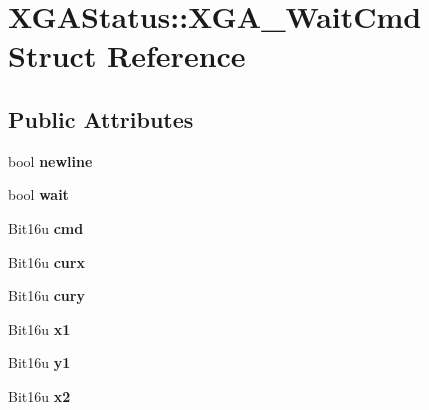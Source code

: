 \hypertarget{structXGAStatus_1_1XGA__WaitCmd}{\section{X\-G\-A\-Status\-:\-:X\-G\-A\-\_\-\-Wait\-Cmd Struct Reference}
\label{structXGAStatus_1_1XGA__WaitCmd}
}
\subsection*{Public Attributes}
\begin{DoxyCompactItemize}
\item 
\hypertarget{structXGAStatus_1_1XGA__WaitCmd_a63d6f451dd4d88b4cb6d128f5e0acc2f}{bool {\bfseries newline}}\label{structXGAStatus_1_1XGA__WaitCmd_a63d6f451dd4d88b4cb6d128f5e0acc2f}

\item 
\hypertarget{structXGAStatus_1_1XGA__WaitCmd_aebb5a2107d507ce29407639622f0eff2}{bool {\bfseries wait}}\label{structXGAStatus_1_1XGA__WaitCmd_aebb5a2107d507ce29407639622f0eff2}

\item 
\hypertarget{structXGAStatus_1_1XGA__WaitCmd_af75876d380fdc091f3931c90e5425b33}{Bit16u {\bfseries cmd}}\label{structXGAStatus_1_1XGA__WaitCmd_af75876d380fdc091f3931c90e5425b33}

\item 
\hypertarget{structXGAStatus_1_1XGA__WaitCmd_aaf89271d9687c8c9e595069205a8c5de}{Bit16u {\bfseries curx}}\label{structXGAStatus_1_1XGA__WaitCmd_aaf89271d9687c8c9e595069205a8c5de}

\item 
\hypertarget{structXGAStatus_1_1XGA__WaitCmd_afbf370accfc2d55e4cd9a5945eb48748}{Bit16u {\bfseries cury}}\label{structXGAStatus_1_1XGA__WaitCmd_afbf370accfc2d55e4cd9a5945eb48748}

\item 
\hypertarget{structXGAStatus_1_1XGA__WaitCmd_ae4b5ad4b1fc4b641709ddeb114034bc0}{Bit16u {\bfseries x1}}\label{structXGAStatus_1_1XGA__WaitCmd_ae4b5ad4b1fc4b641709ddeb114034bc0}

\item 
\hypertarget{structXGAStatus_1_1XGA__WaitCmd_a2ab9f584a011422de2b83b70e481628f}{Bit16u {\bfseries y1}}\label{structXGAStatus_1_1XGA__WaitCmd_a2ab9f584a011422de2b83b70e481628f}

\item 
\hypertarget{structXGAStatus_1_1XGA__WaitCmd_a05563800f79b2e901f97a313e974ef8a}{Bit16u {\bfseries x2}}\label{structXGAStatus_1_1XGA__WaitCmd_a05563800f79b2e901f97a313e974ef8a}


\end{DoxyCompactItemize}
